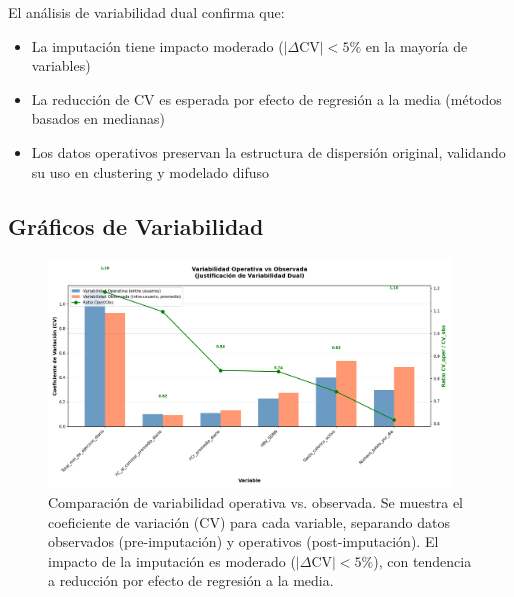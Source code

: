 \documentclass[12pt,letterpaper,twoside]{report}
\begin{document}
\begin{calculobox}
\begin{conclusionbox}
El análisis de variabilidad dual confirma que:
\begin{itemize}[noitemsep]
    \item La imputación tiene impacto moderado ($|\Delta\text{CV}| < 5\%$ en la mayoría de variables)
    \item La reducción de CV es esperada por efecto de regresión a la media (métodos basados en medianas)
    \item Los datos operativos preservan la estructura de dispersión original, validando su uso en clustering y modelado difuso
\end{itemize}
\end{conclusionbox}

\subsection{Gráficos de Variabilidad}

\begin{figure}[htbp]
\centering
\includegraphics[width=0.95\textwidth]{../analisis_u/variabilidad_dual/plots_consolidados/variabilidad_operativa_vs_observada.png}
\caption{Comparación de variabilidad operativa vs. observada. Se muestra el coeficiente de variación (CV) para cada variable, separando datos observados (pre-imputación) y operativos (post-imputación). El impacto de la imputación es moderado ($|\Delta\text{CV}| < 5\%$), con tendencia a reducción por efecto de regresión a la media.}
\label{fig:variabilidad_operativa_vs_observada}
\end{figure}


\end{calculobox}
\end{document}

